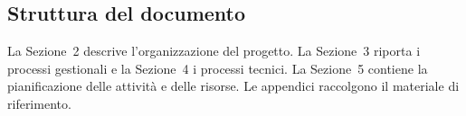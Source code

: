 \subsection{Struttura del documento}
La Sezione~2 descrive l'organizzazione del progetto. La Sezione~3 riporta i processi gestionali e la Sezione~4 i processi tecnici.
La Sezione~5 contiene la pianificazione delle attività e delle risorse. Le appendici raccolgono il materiale di riferimento.
